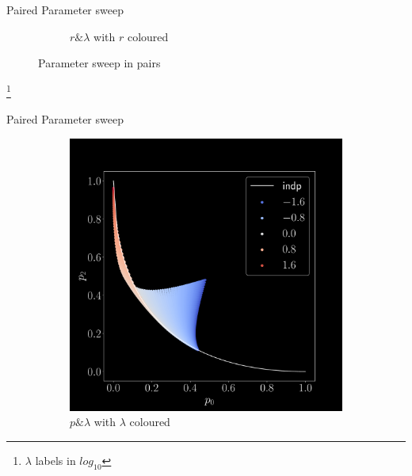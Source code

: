 \documentclass[aspectratio=169,9pt]{beamer}
\begin{document}
\begin{frame}{Paired Parameter sweep}
\begin{figure}[h]
\begin{adjustwidth}{-7cm}{-7cm}
\begin{subfigure}[b]{0.25\textwidth}
        \caption{$r \& \lambda$ with $r$ coloured}
      \end{subfigure}
    \end{adjustwidth}
    \pause[-1]\caption{Parameter sweep in pairs}
  \end{figure}
  \footnote{$\lambda$ labels in $log_{10}$}
\end{frame}

\begin{frame}{Paired Parameter sweep}
  \begin{figure}[h]
    \begin{adjustwidth}{-7cm}{-7cm}
      \centering
      \begin{subfigure}[b]{0.25\textwidth}
        \centering
        \includegraphics[width=\textwidth]{sweep-pl-l}
        \caption{$p \& \lambda$ with $\lambda$ coloured}
      \end{subfigure}
      \begin{subfigure}[b]{0.25\textwidth}
        \centering

\end{subfigure}
\end{adjustwidth}
\end{figure}
\end{frame}
\end{document}
